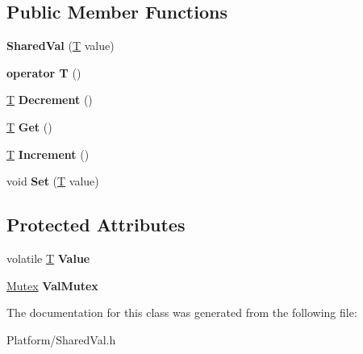\subsection*{Public Member Functions}
\begin{DoxyCompactItemize}
\item 
\mbox{\label{class_gost_crypt_1_1_shared_val_aa2a848bf113f4d4be9461f42e3ca57e1}} 
{\bfseries Shared\+Val} (\hyperlink{_stribog_8c_aba2f4c400d7a4c0bf0296be622087314}{T} value)
\item 
\mbox{\label{class_gost_crypt_1_1_shared_val_a1daf69e158143e7d7112044897e09b20}} 
{\bfseries operator T} ()
\item 
\mbox{\label{class_gost_crypt_1_1_shared_val_ac64316f817015976ecf7db1b1c775a5a}} 
\hyperlink{_stribog_8c_aba2f4c400d7a4c0bf0296be622087314}{T} {\bfseries Decrement} ()
\item 
\mbox{\label{class_gost_crypt_1_1_shared_val_a75472cfa9698c7cad8f1755439ae5ba0}} 
\hyperlink{_stribog_8c_aba2f4c400d7a4c0bf0296be622087314}{T} {\bfseries Get} ()
\item 
\mbox{\label{class_gost_crypt_1_1_shared_val_af0602d2d4ceea7adc2f52a616dfedf15}} 
\hyperlink{_stribog_8c_aba2f4c400d7a4c0bf0296be622087314}{T} {\bfseries Increment} ()
\item 
\mbox{\label{class_gost_crypt_1_1_shared_val_ae0cf680942020162f1326af49b99a98b}} 
void {\bfseries Set} (\hyperlink{_stribog_8c_aba2f4c400d7a4c0bf0296be622087314}{T} value)
\end{DoxyCompactItemize}
\subsection*{Protected Attributes}
\begin{DoxyCompactItemize}
\item 
\mbox{\label{class_gost_crypt_1_1_shared_val_a9143e3f14e408588c5fc28485a553a18}} 
volatile \hyperlink{_stribog_8c_aba2f4c400d7a4c0bf0296be622087314}{T} {\bfseries Value}
\item 
\mbox{\label{class_gost_crypt_1_1_shared_val_a7359bbdec4f8be3707bd9f4c499cd8bb}} 
\hyperlink{class_gost_crypt_1_1_mutex}{Mutex} {\bfseries Val\+Mutex}
\end{DoxyCompactItemize}


The documentation for this class was generated from the following file\+:\begin{DoxyCompactItemize}
\item 
Platform/Shared\+Val.\+h\end{DoxyCompactItemize}
